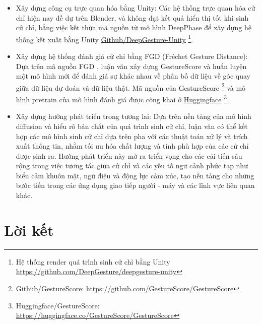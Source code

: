 \begin{itemize}
	\item Xây dựng công cụ trực quan hóa bằng Unity: Các hệ thống trực quan hóa cử chỉ hiện nay đề dự trên Blender, và không đạt kết quả hiển thị tốt khi sinh cử chỉ, bằng việc kết thừa mã nguồn từ mô hình DeepPhase \cite{starke2022deepphase} để xây dựng hệ thống kết xuất bằng Unity \hyperlink{https://github.com/DeepGesture/deepgesture-unity}{Github/DeepGesture-Unity}
	\footnote{Hệ thống render quá trình sinh cử chỉ bằng Unity \url{https://github.com/DeepGesture/deepgesture-unity}}.
	
	\item Xây dựng hệ thống đánh giá cử chỉ bằng FGD (Fréchet Gesture Distance): Dựa trên mã nguồn FGD \cite{yoon2020speech}, luận văn xây dựng GestureScore và huấn luyện một mô hình mới để đánh giá sự khác nhau về phân bố dữ liệu về góc quay giữa dữ liệu dự đoán và dữ liệu thật. Mã nguồn của  \hyperlink{https://github.com/GestureScore/GestureScore}{GestureScore} \footnote{Github/GestureScore: \url{https://github.com/GestureScore/GestureScore}} và mô hình pretrain của mô hình đánh giá được công khai ở  \hyperlink{https://huggingface.co/GestureScore}{Huggingface} \footnote{Huggingface/GestureScore: \url{https://huggingface.co/GestureScore/GestureScore}}
	\item Xây dựng hướng phát triển trong tương lai: Dựa trên nền tảng của mô hình diffusion và hiểu rõ bản chất của quá trình sinh cử chỉ, luận văn có thể kết hợp các mô hình sinh cử chỉ dựa trên pha với các thuật toán xử lý và trích xuất thông tin, nhằm tối ưu hóa chất lượng và tính phù hợp của các cử chỉ được sinh ra. Hướng phát triển này mở ra triển vọng cho các cải tiến sâu rộng trong việc tương tác giữa cử chỉ và các yếu tố ngữ cảnh phức tạp như biểu cảm khuôn mặt, ngữ điệu và động lực cảm xúc, tạo nền tảng cho những bước tiến trong các ứng dụng giao tiếp người - máy và các lĩnh vực liên quan khác.
\end{itemize}





\newpage


\section{Lời kết}

